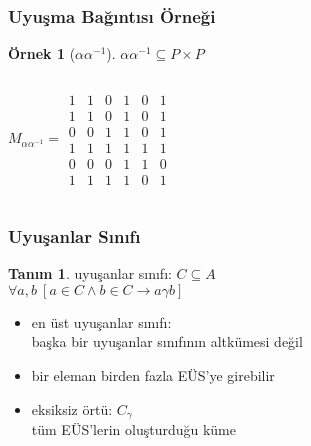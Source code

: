 \documentclass[dvipsnames]{beamer}
\theoremstyle{definition}
\newtheorem{tanim}[theorem]{Tanım}
\theoremstyle{example}
\newtheorem{ornek}[theorem]{Örnek}
\theoremstyle{plain}
\begin{document}
\begin{frame}
  \frametitle{Uyuşma Bağıntısı Örneği}

  \begin{ornek}[$\alpha \alpha^{-1}$]
    $\alpha \alpha^{-1} \subseteq P \times P$

    \begin{columns}
      \[
        M_{\alpha \alpha^{-1}} =
          \begin{array}{|cccccc|}
            1  &  1  &  0  &  1  &  0  &  1\\
            1  &  1  &  0  &  1  &  0  &  1\\
            0  &  0  &  1  &  1  &  0  &  1\\
            1  &  1  &  1  &  1  &  1  &  1\\
            0  &  0  &  0  &  1  &  1  &  0\\
            1  &  1  &  1  &  1  &  0  &  1
          \end{array}
      \]

      \begin{center}
      \end{center}
    \end{columns}
  \end{ornek}
\end{frame}

\begin{frame}
  \frametitle{Uyuşanlar Sınıfı}

  \begin{tanim}
    \alert{uyuşanlar sınıfı}: $C \subseteq A$\\
      $\forall a,b~[a \in C \wedge b \in C \rightarrow a \gamma b]$
  \end{tanim}

  \pause
  \medskip
  \begin{itemize}
    \item \alert{en üst uyuşanlar sınıfı}:\\
      başka bir uyuşanlar sınıfının altkümesi değil
    \item bir eleman birden fazla EÜS'ye girebilir

    \pause
    \medskip
    \item \alert{eksiksiz örtü}: $C_\gamma$\\
      tüm EÜS'lerin oluşturduğu küme
  \end{itemize}
\end{frame}
\end{document}
